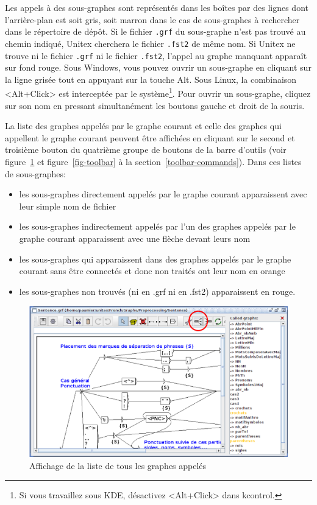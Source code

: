 
\bigskip
\noindent Les appels à des sous-graphes sont représentés dans les boîtes par des lignes dont
l’arrière-plan est soit gris, soit marron dans le cas de sous-graphes à rechercher dans le 
répertoire de dépôt. Si le fichier \verb+.grf+ du sous-graphe n'est pas trouvé au chemin indiqué,
Unitex cherchera le fichier \verb+.fst2+ de même nom. Si Unitex ne trouve ni le fichier \verb+.grf+
ni le fichier \verb+.fst2+, l'appel au graphe manquant apparaît sur fond rouge. Sous Windows, vous
pouvez ouvrir un sous-graphe en cliquant sur la ligne grisée tout en appuyant sur la touche Alt.
Sous Linux, la combinaison <Alt+Click> est interceptée par le système\footnote{Si vous travaillez
sous KDE, désactivez <Alt+Click> dans kcontrol.}.
Pour ouvrir un sous-graphe, cliquez sur son nom en pressant simultanément les boutons gauche
et droit de la souris.


\bigskip
\noindent La liste des graphes appelés par le graphe courant et celle des graphes qui appellent le
graphe courant peuvent être affichées en cliquant sur le second et troisième bouton du quatrième
groupe de boutons de la barre d'outils (voir figure~\ref{list-called-graphs} et
figure~\ref{fig-toolbar} à la section~\ref{toolbar-commands}).
Dans ces listes de sous-graphes:
\begin{itemize}
\item les sous-graphes directement appelés par le graphe courant apparaissent avec leur simple nom
	de fichier
\item les sous-graphes indirectement appelés par l'un des graphes appelés par le graphe courant
	apparaissent avec une flèche devant leurs nom
\item les sous-graphes qui apparaissent dans des graphes appelés par le graphe courant sans être
	connectés et donc non traités  ont leur nom en orange
\item les sous-graphes non trouvés (ni en .grf ni en .fst2) apparaissent en rouge.
\end{itemize}

\begin{figure}[!h]
\begin{center}
\includegraphics[width=15.2cm]{resources/img/fig5-12b.png}
\caption{Affichage de la liste de tous les graphes appelés\label{list-called-graphs}}
\end{center}
\end{figure}


